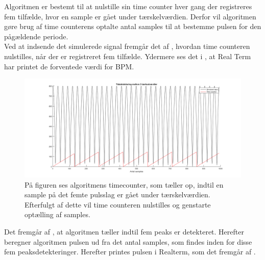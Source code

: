Algoritmen er bestemt til at nulstille sin time counter hver gang der registreres fem tilfælde, hvor en sample er gået under tærskelværdien. Derfor vil algoritmen gøre brug af time counterens optalte antal samples til at bestemme pulsen for den pågældende periode. \\
Ved at indsende det simulerede signal fremgår det af , hvordan time counteren nulstilles, når der er registreret fem tilfælde. Ydermere ses det i , at Real Term har printet de forventede værdi for BPM.
\begin{figure}[H]
	\centering
	\includegraphics[scale=0.4]{figures/cDesign/timecounter_puls_pic.png}
	\caption{På figuren ses algoritmens timecounter, som tæller op, indtil en sample på det femte pulsslag er gået under tærskelværdien. Efterfulgt af dette vil time counteren nulstilles og genstarte optælling af samples.}
\label{fig:timecounter_puls_realterm}
\end{figure}
Det fremgår af , at algoritmen tæller indtil fem peaks er detekteret. Herefter beregner algoritmen pulsen ud fra det antal samples, som findes inden for disse fem peaksdetekteringer. Herefter printes pulsen i Realterm, som det fremgår af .

